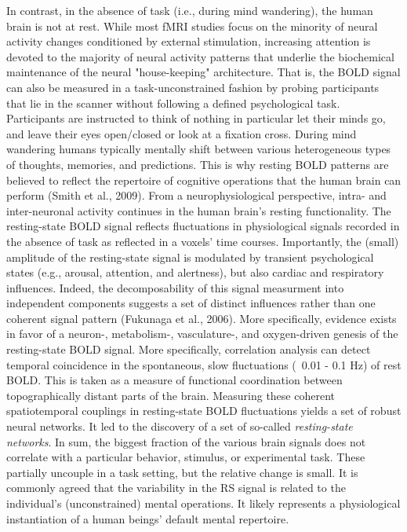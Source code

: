 \documentclass[authoryear,review,3p]{elsarticle}
\begin{document}
In contrast,
in the absence of task (i.e., during mind wandering),
the human brain is not at rest.
While most fMRI studies focus on the minority of neural activity changes
conditioned by external stimulation,
increasing attention is devoted to
the majority of neural activity patterns
that underlie the biochemical maintenance of
the neural "house-keeping" architecture.
That is,
the BOLD signal can also be measured in a task-unconstrained fashion
by probing participants that lie in the scanner without following
a defined psychological task.
Participants are instructed to think of nothing in particular
let their minds go, and leave their eyes open/closed or
look at a fixation cross. During mind wandering humans typically mentally shift
between various heterogeneous types of thoughts, memories, and predictions.
This is why resting BOLD patterns are believed to reflect the repertoire of
cognitive operations that the human brain can perform (Smith et al., 2009).
%
From a neurophysiological perspective,
intra- and inter-neuronal activity continues
in the human brain's resting functionality.
The resting-state BOLD signal reflects fluctuations in
physiological signals recorded in the absence of task
as reflected in a voxels' time courses.
Importantly, the (small) amplitude of the resting-state signal is modulated by
transient psychological states (e.g., arousal, attention, and alertness),
but also cardiac and respiratory influences.
Indeed, the decomposability of this signal measurment into independent
components suggests a set of distinct influences rather
than one coherent signal pattern (Fukunaga et al., 2006).
More specifically, evidence exists in favor of a neuron-, metabolism-,
vasculature-, and oxygen-driven genesis of the resting-state BOLD signal. 
%
More specifically,
correlation analysis can detect temporal coincidence in
the spontaneous, slow fluctuations (~0.01 - 0.1 Hz) of rest BOLD.
This is taken as a measure of functional coordination between
topographically distant parts of the brain.
Measuring these coherent spatiotemporal couplings in resting-state BOLD
fluctuations yields a set of robust neural networks.
It led to the discovery of a set of so-called
\textit{resting-state networks}.
%
In sum, the biggest fraction of the various brain
signals does not correlate with a particular
behavior, stimulus, or experimental task.
These partially uncouple in a task setting,
but the relative change is small.
It is commonly agreed that the variability in the RS signal is
related to the individual's (unconstrained) mental operations.
It likely represents a physiological
instantiation of a human beings' default mental repertoire.
\end{document}
